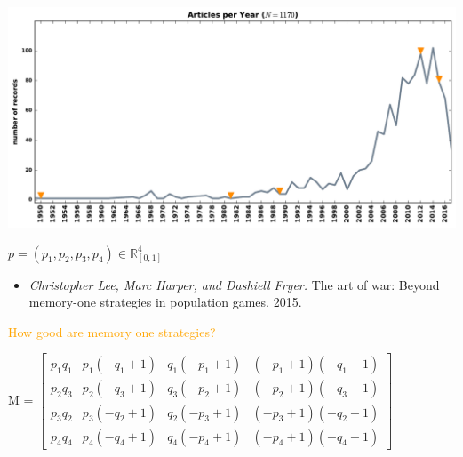 \documentclass{beamer}
\begin{document}
\begin{frame}
    \begin{center}
        \includegraphics[width=\textwidth]{timeline.pdf}
    \end{center}
\end{frame}

\begin{frame}
  \centering
  

  \vfill
  \large
  \( p = (p_1, p_2, p_3, p_4) \in\mathbb{R}_{[0,1]}^{4} \)
\end{frame}


\begin{frame}
    \begin{center}
       \begin{itemize}
        \item  \textit{Christopher Lee, Marc Harper, and Dashiell Fryer.}
               The art of war: Beyond memory-one strategies in population games. 2015.
        \end{itemize}
    \end{center}
\end{frame}

\begin{frame}
    \begin{center}
        \Large{\textcolor{orange}{How good are memory one strategies?}}
    \end{center}
\end{frame}

\begin{frame}
  \centering
  
\end{frame}

\begin{frame}
    \begin{center}
    \small{
           M = \(\begin{bmatrix}
           p_{1} q_{1}& p_{1} (- q_{1} + 1) & q_{1} (- p_{1} + 1) & (- p_{1} + 1) (- q_{1} + 1)
           \\
           p_{2} q_{3} & p_{2} (- q_{3} + 1) & q_{3} (- p_{2} + 1) & (- p_{2} + 1) (- q_{3} + 1)
           \\
           p_{3} q_{2} & p_{3} (- q_{2} + 1) & q_{2} (- p_{3} + 1) & (- p_{3} + 1) (- q_{2} + 1)
           \\
           p_{4} q_{4} & p_{4} (- q_{4} + 1) & q_{4} (- p_{4} + 1) & (- p_{4} + 1) (- q_{4} + 1)\end{bmatrix}\)
           }
    \end{center}
\end{frame}
\end{document}
